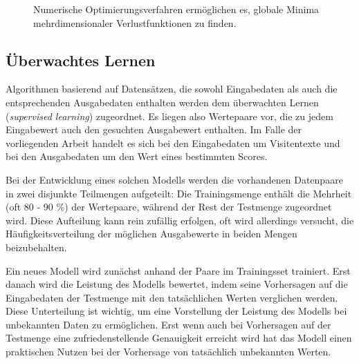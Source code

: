 \begin{figure}[htb]
    \captionsetup{justification=centering}

    \centering
    
    \centering
    \caption{Numerische Optimierungsverfahren ermöglichen es, globale Minima mehrdimensionaler Verlustfunktionen zu finden.}
    \label{fig:optimierung}
\end{figure}

\subsection{Überwachtes Lernen}\label{section:supervised_learning}

Algorithmen basierend auf Datensätzen, die sowohl Eingabedaten als auch die entsprechenden Ausgabedaten enthalten werden dem überwachten Lernen (\textit{supervised learning}) zugeordnet\citep{russellArtificialIntelligenceModern2020}. Es liegen also Wertepaare vor, die zu jedem Eingabewert auch den gesuchten Ausgabewert enthalten. Im Falle der vorliegenden Arbeit handelt es sich bei den Eingabedaten um Visitentexte und bei den Ausgabedaten um den Wert eines bestimmten Scores. 

Bei der Entwicklung eines solchen Modells werden die vorhandenen Datenpaare in zwei disjunkte Teilmengen aufgeteilt: Die Trainingsmenge enthält die Mehrheit (oft 80 - 90 \%) der Wertepaare, während der Rest der Testmenge zugeordnet wird. Diese Aufteilung kann rein zufällig erfolgen, oft wird allerdings versucht, die Häufigkeitsverteilung der möglichen Ausgabewerte in beiden Mengen beizubehalten.

Ein neues Modell wird zunächst anhand der Paare im Trainingsset trainiert. Erst danach wird die Leistung des Modells bewertet, indem seine Vorhersagen auf die Eingabedaten der Testmenge mit den tatsächlichen Werten verglichen werden. Diese Unterteilung ist wichtig, um eine Vorstellung der Leistung des Modells bei unbekannten Daten zu ermöglichen. Erst wenn auch bei Vorhersagen auf der Testmenge eine zufriedenstellende Genauigkeit erreicht wird hat das Modell einen praktischen Nutzen bei der Vorhersage von tatsächlich unbekannten Werten.

